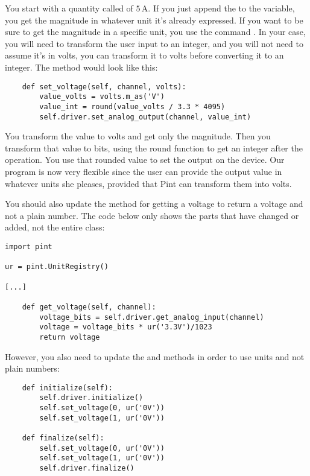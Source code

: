 You start with a quantity called  of $5\,\textrm{A}$. If you just append the  to the variable, you get the magnitude in whatever unit it's already expressed. If you want to be sure to get the magnitude in a specific unit, you use the command . In your case, you will need to transform the user input to an integer, and you will not need to assume it's in volts, you can transform it to volts before converting it to an integer. The  method would look like this:

\begin{verbatim}
    def set_voltage(self, channel, volts):
        value_volts = volts.m_as('V')
        value_int = round(value_volts / 3.3 * 4095)
        self.driver.set_analog_output(channel, value_int)
\end{verbatim}

You transform the value to volts and get only the magnitude. Then you transform that value to bits, using the round function to get an integer after the operation. You use that rounded value to set the output on the device. Our program is now very flexible since the user can provide the output value in whatever units she pleases, provided that Pint can transform them into volts.


You should also update the method for getting a voltage to return a voltage and not a plain number. The code below only shows the parts that have changed or added, not the entire class:

\begin{verbatim}
import pint

ur = pint.UnitRegistry()

[...]

    def get_voltage(self, channel):
        voltage_bits = self.driver.get_analog_input(channel)
        voltage = voltage_bits * ur('3.3V')/1023
        return voltage
\end{verbatim}

However, you also need to update the  and  methods in order to use units and not plain numbers:

\begin{verbatim}
    def initialize(self):
        self.driver.initialize()
        self.set_voltage(0, ur('0V'))
        self.set_voltage(1, ur('0V'))

    def finalize(self):
        self.set_voltage(0, ur('0V'))
        self.set_voltage(1, ur('0V'))
        self.driver.finalize()
\end{verbatim}

